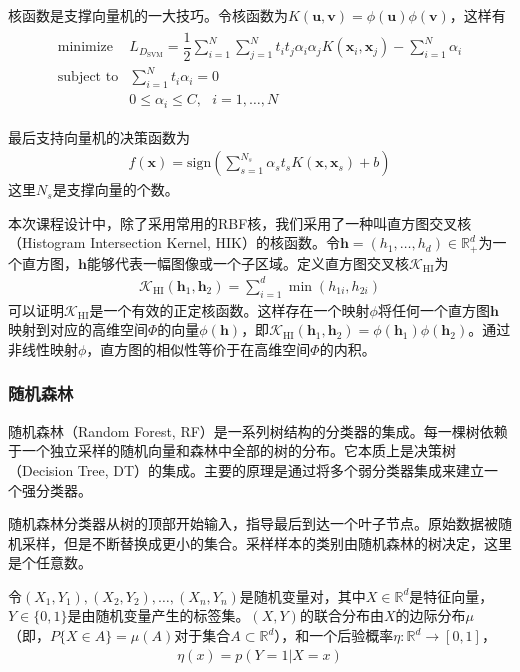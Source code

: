 \documentclass[supercite]{HustGraduPaper}
\begin{document}
\begin{sloppypar}
  核函数是支撑向量机的一大技巧。令核函数为$K(\bm{u},\bm{v})=\phi(\bm{u})\phi(\bm{v})$，这样有\begin{gather}
  \begin{array}{ll}
  \text{minimize}&L_{D_{\text{SVM}}}=\dfrac{1}{2}\sum\limits^N_{i=1}\sum\limits^N_{j=1}t_it_j\alpha_i\alpha_jK(\bm{x}_i,\bm{x}_j)-\sum\limits^N_{i=1}\alpha_i\\
  \text{subject to}&\sum\limits^N_{i=1}t_i\alpha_i=0\\
                   &0\leq\alpha_i\leq C,\text{ }i=1,\dots,N
  \end{array}
  \end{gather}
  
  最后支持向量机的决策函数为\begin{gather}
  f(\bm{x})=\text{sign}\left( \sum\limits^{N_s}_{s=1}\alpha_st_sK(\bm{x},\bm{x}_s)+b \right)
  \end{gather}
  这里$N_s$是支撑向量的个数。

  本次课程设计中，除了采用常用的RBF核，我们采用了一种叫直方图交叉核（Histogram Intersection Kernel, HIK）的核函数\cite{5459178}。令$\bm{h}=(h_1,\dots,h_d)\in\mathbb{R}^d_+$为一个直方图，$\bm{h}$能够代表一幅图像或一个子区域。定义直方图交叉核$\mathcal{K}_{\text{HI}}$为\begin{gather}
   \mathcal{K}_{\text{HI}}(\bm{h}_1,\bm{h}_2)=\sum\limits^d_{i=1}\min(h_{1i},h_{2i})
  \end{gather}
  可以证明$\mathcal{K}_{\text{HI}}$是一个有效的正定核函数。这样存在一个映射$\phi$将任何一个直方图$\bm{h}$映射到对应的高维空间$\Phi$的向量$\phi(\bm{h})$，即$\mathcal{K}_{\text{HI}}(\bm{h}_1,\bm{h}_2)=\phi(\bm{h}_1)\phi(\bm{h}_2)$。通过非线性映射$\phi$，直方图的相似性等价于在高维空间$\Phi$的内积。
  \subsubsection{随机森林}
  随机森林（Random Forest, RF）是一系列树结构的分类器的集成。每一棵树依赖于一个独立采样的随机向量和森林中全部的树的分布。它本质上是决策树（Decision Tree, DT）的集成。主要的原理是通过将多个弱分类器集成来建立一个强分类器。

  随机森林分类器从树的顶部开始输入，指导最后到达一个叶子节点。原始数据被随机采样，但是不断替换成更小的集合。采样样本的类别由随机森林的树决定，这里是个任意数。

  令$(X_1,Y_1),(X_2,Y_2),\dots,(X_n,Y_n)$是随机变量对，其中$X\in\mathbb{R}^d$是特征向量，$Y\in\{ 0,1 \}$是由随机变量产生的标签集。$(X,Y)$的联合分布由$X$的边际分布$\mu$（即，$P\{ X\in A \}=\mu(A)$对于集合$A\subset \mathbb{R}^d$），和一个后验概率$\eta:\mathbb{R}^d\to[0,1]$，\begin{gather}
   \eta(x)=p(Y=1|X=x)
  \end{gather}


\end{sloppypar}
\end{document}
